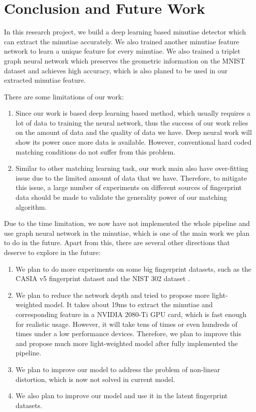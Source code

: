 \section{Conclusion and Future Work}
\label{sec:conclusion}

In this research project, we build a deep learning based minutiae detector which can extract the minutiae accurately.
We also trained another minutiae feature network to learn a unique feature for every minutiae.
We also trained a triplet graph neural network which preserves the geometric information on the MNIST dataset and achieves high accuracy, which is also planed to be used in our extracted minutiae feature.

There are some limitations of our work:
\begin{enumerate}
    \item Since our work is based deep learning based method, which usually requires a lot of data to training the neural network, thus the success of our work relies on the amount of data and the quality of data we have. Deep neural work will show its power once more data is available. However, conventional hard coded matching conditions do not suffer from this problem.
    \item Similar to other matching learning task, our work main also have over-fitting issue due to the limited amount of data that we have. Therefore, to mitigate this issue, a large number of experiments on different sources of fingerprint data should be made to validate the generality power of our matching algorithm.
\end{enumerate}

Due to the time limitation, we now have not implemented the whole pipeline and use graph neural network in the minutiae, which is one of the main work we plan to do in the future.
Apart from this, there are several other directions that deserve to explore in the future:

\begin{enumerate}
    \item We plan to do more experiments on some big fingerprint datasets, such as the CASIA v5 fingerprint dataset \cite{CASIAFingerprintV5} and the NIST 302 dataset \cite{NIST302}.
    \item We plan to reduce the network depth and tried to propose more light-weighted model. 
    It takes about 19ms to extract the minutiae and corresponding feature in a NVIDIA 2080-Ti GPU card, which is fast enough for realistic usage.
    However, it will take tens of times or even hundreds of times under a low performance devices.
    Therefore, we plan to improve this and propose much more light-weighted model after fully implemented the pipeline.
    \item We plan to improve our model to address the problem of non-linear distortion, which is now not solved in current model.
    \item We also plan to improve our model and use it in the latent fingerprint datasets.
\end{enumerate}

